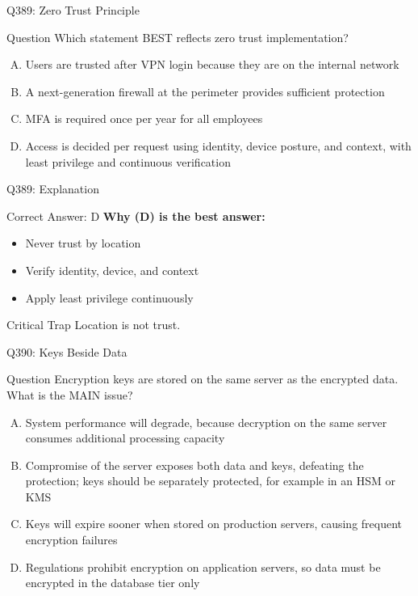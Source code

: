 \documentclass{beamer}
\begin{document}
	\begin{frame}{Q389: Zero Trust Principle}
		\begin{block}{Question}
			\small Which statement BEST reflects zero trust implementation?
		\end{block}
		\begin{enumerate}[(A)]
			\footnotesize
			\item Users are trusted after VPN login because they are on the internal network
			\item A next-generation firewall at the perimeter provides sufficient protection
			\item MFA is required once per year for all employees
			\item Access is decided per request using identity, device posture, and context, with least privilege and continuous verification
		\end{enumerate}
	\end{frame}
	
	\begin{frame}{Q389: Explanation}
		\begin{block}{Correct Answer: D}
			\textbf{Why (D) is the best answer:}
			\begin{itemize}
				\item Never trust by location
				\item Verify identity, device, and context
				\item Apply least privilege continuously
			\end{itemize}
		\end{block}
		\begin{alertblock}{Critical Trap}
			Location is not trust.
		\end{alertblock}
	\end{frame}
	
	\begin{frame}{Q390: Keys Beside Data}
		\begin{block}{Question}
			\small Encryption keys are stored on the same server as the encrypted data. What is the MAIN issue?
		\end{block}
		\begin{enumerate}[(A)]
			\footnotesize
			\item System performance will degrade, because decryption on the same server consumes additional processing capacity
			\item Compromise of the server exposes both data and keys, defeating the protection; keys should be separately protected, for example in an HSM or KMS
			\item Keys will expire sooner when stored on production servers, causing frequent encryption failures
			\item Regulations prohibit encryption on application servers, so data must be encrypted in the database tier only
		\end{enumerate}
	\end{frame}
	
\end{document}
